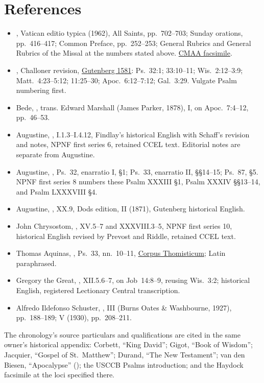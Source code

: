 \section{References}
\begin{itemize}
\item {}, Vatican editio typica (1962),
All Saints, pp.~702--703; Sunday orations, pp.~416--417;
Common Preface, pp.~252--253; General Rubrics and General
Rubrics of the Missal at the numbers stated above.
\href{https://media.churchmusicassociation.org/pdf/missale62.pdf}{CMAA facsimile}.
\item {}, Challoner revision,
\href{https://www.gutenberg.org/ebooks/1581}{Gutenberg 1581}:
Ps.~32:1; 33:10--11; Wis.~2:12--3:9;
Matt.~4:23--5:12; 11:25--30; Apoc.~6:12--7:12;
Gal.~3:29. Vulgate Psalm numbering first.
\item Bede, ,
trans. Edward Marshall (James Parker, 1878), I, on
Apoc.~7:4--12, pp.~46--53.
\item Augustine, ,
I.1.3--I.4.12, Findlay's historical English with
Schaff's revision and notes, NPNF first series 6,
retained CCEL text. Editorial notes are separate from Augustine.
\item Augustine, ,
Ps.~32, enarratio I, \S1; Ps.~33, enarratio II,
\S\S14--15; Ps.~87, \S5. NPNF first series 8
numbers these Psalm XXXIII \S1, Psalm XXXIV
\S\S13--14, and Psalm LXXXVIII \S4.
\item Augustine, , XX.9,
Dods edition, II (1871), Gutenberg historical English.
\item John Chrysostom, ,
XV.5--7 and XXXVIII.3--5, NPNF first series 10,
historical English revised by Prevost and Riddle,
retained CCEL text.
\item Thomas Aquinas, , Ps.~33,
nn.~10--11, \href{https://www.corpusthomisticum.org/cps31.html}{Corpus Thomisticum};
Latin paraphrased.
\item Gregory the Great, ,
XII.5.6--7, on Job~14:8--9, reusing Wis.~3:2;
 historical English,
registered Lectionary Central transcription.
\item Alfredo Ildefonso Schuster, ,
III (Burns Oates \& Washbourne, 1927), pp.~188--189;
V (1930), pp.~208--211.
\end{itemize}
The chronology's source particulars and qualifications are cited
in the same owner's historical appendix: Corbett, ``King David'';
Gigot, ``Book of Wisdom''; Jacquier, ``Gospel of St.~Matthew'';
Durand, ``The New Testament''; van den Biesen, ``Apocalypse''
(); the USCCB Psalms introduction;
and the Haydock facsimile at the loci specified there.
